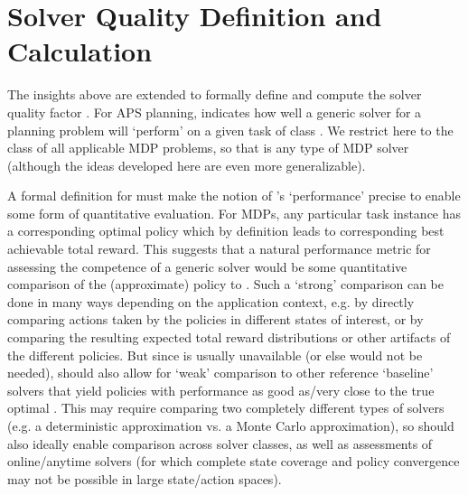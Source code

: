 \section{Solver Quality Definition and Calculation} \label{sec:SQ}


The insights above are extended to formally define and compute the solver quality \famsec{} factor \xQ{}. For APS planning, \xQ{} indicates how well a generic solver \solve{} for a planning problem will `perform' on a given task \task{} of class \taskclass{}. We restrict \taskclass{} here to the class of all applicable MDP problems, so that \solve{} is any type of MDP solver  (although the ideas developed here are even more generalizable). %


A formal definition for \xQ{} must make the notion of \solve{}'s `performance' precise to enable some form of quantitative evaluation. For MDPs, any particular task instance \task{} has a corresponding optimal policy \piopt{} which by definition leads to corresponding best achievable total reward. This suggests that a natural performance metric for assessing the competence of a generic solver \solve{} would be some quantitative comparison of the (approximate) policy \piapprox{} to \piopt. Such a `strong' comparison can be done in many ways depending on the application context, e.g. by directly comparing actions taken by the policies in different states of interest, or by comparing the resulting expected total reward distributions or other artifacts of the different policies. 
But since \piopt{} is usually unavailable (or else \solve{} would not be needed), \xQ{} should also allow for `weak' comparison to other reference `baseline' solvers that yield policies with performance as good as/very close to the true optimal \piopt. This may require comparing two completely different types of solvers (e.g. a deterministic approximation vs. a Monte Carlo approximation), so \xQ{} should also ideally enable comparison across solver classes, as well as assessments of online/anytime solvers (for which complete state coverage and policy convergence may not be possible in large state/action spaces). %

